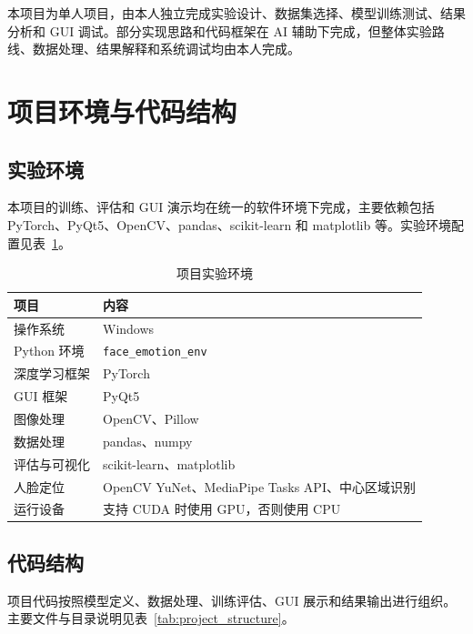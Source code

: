 \documentclass[UTF8,a4paper,12pt]{ctexart}
\newcommand{\code}[1]{\texttt{#1}}
\begin{document}
本项目为单人项目，由本人独立完成实验设计、数据集选择、模型训练测试、结果分析和 GUI 调试。部分实现思路和代码框架在 AI 辅助下完成，但整体实验路线、数据处理、结果解释和系统调试均由本人完成。

\section{项目环境与代码结构}

\subsection{实验环境}

本项目的训练、评估和 GUI 演示均在统一的软件环境下完成，主要依赖包括 PyTorch、PyQt5、OpenCV、pandas、scikit-learn 和 matplotlib 等。实验环境配置见表~\ref{tab:experiment_env}。

\begin{table}[H]
  \centering
  \caption{项目实验环境}
  \label{tab:experiment_env}
  \begin{tabularx}{\textwidth}{lX}
    \toprule
    项目 & 内容 \\
    \midrule
    操作系统 & Windows \\
    Python 环境 & \code{face\_emotion\_env} \\
    深度学习框架 & PyTorch \\
    GUI 框架 & PyQt5 \\
    图像处理 & OpenCV、Pillow \\
    数据处理 & pandas、numpy \\
    评估与可视化 & scikit-learn、matplotlib \\
    人脸定位 & OpenCV YuNet、MediaPipe Tasks API、中心区域识别 \\
    运行设备 & 支持 CUDA 时使用 GPU，否则使用 CPU \\
    \bottomrule
  \end{tabularx}
\end{table}

\subsection{代码结构}

项目代码按照模型定义、数据处理、训练评估、GUI 展示和结果输出进行组织。主要文件与目录说明见表~\ref{tab:project_structure}。
\end{document}
